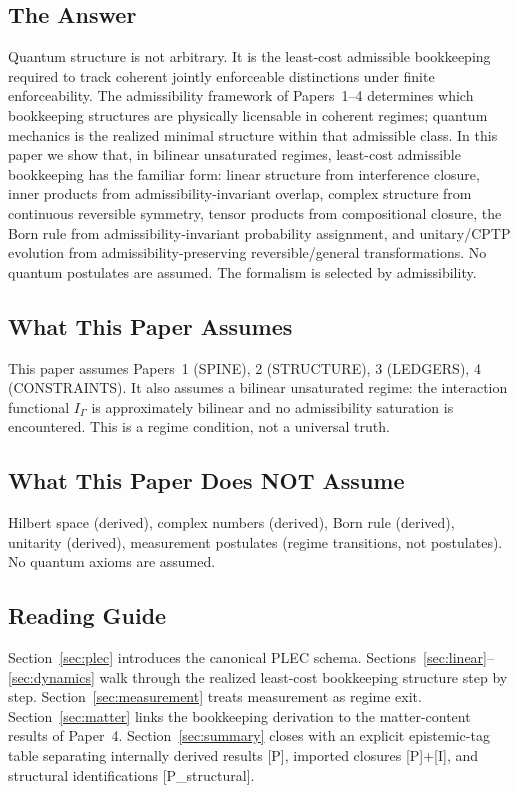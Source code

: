 \documentclass[11pt]{article}
\begin{document}
\subsection{The Answer}
Quantum structure is not arbitrary. It is the least-cost admissible bookkeeping
required to track coherent jointly enforceable distinctions under finite
enforceability. The admissibility framework of Papers~1--4 determines which
bookkeeping structures are physically licensable in coherent regimes; quantum
mechanics is the realized minimal structure within that admissible class. In this
paper we show that, in bilinear unsaturated regimes, least-cost admissible
bookkeeping has the familiar form: linear structure from interference closure,
inner products from admissibility-invariant overlap, complex structure from
continuous reversible symmetry, tensor products from compositional closure, the
Born rule from admissibility-invariant probability assignment, and unitary/CPTP
evolution from admissibility-preserving reversible/general transformations. No
quantum postulates are assumed. The formalism is selected by admissibility.

\subsection{What This Paper Assumes}
This paper assumes Papers~1 (SPINE), 2 (STRUCTURE), 3 (LEDGERS), 4 (CONSTRAINTS).
It also assumes a bilinear unsaturated regime: the interaction functional
$I_{\Gamma}$ is approximately bilinear and no admissibility saturation is
encountered. This is a regime condition, not a universal truth.

\subsection{What This Paper Does NOT Assume}
Hilbert space (derived), complex numbers (derived), Born rule (derived), unitarity
(derived), measurement postulates (regime transitions, not postulates). No quantum
axioms are assumed.

\subsection{Reading Guide}
Section~\ref{sec:plec} introduces the canonical PLEC schema. Sections~\ref{sec:linear}--\ref{sec:dynamics}
walk through the realized least-cost bookkeeping structure step by step.
Section~\ref{sec:measurement} treats measurement as regime exit. Section~\ref{sec:matter}
links the bookkeeping derivation to the matter-content results of Paper~4.
Section~\ref{sec:summary} closes with an explicit epistemic-tag table separating
internally derived results [P], imported closures [P]+[I], and structural
identifications [P\_structural].
\end{document}
